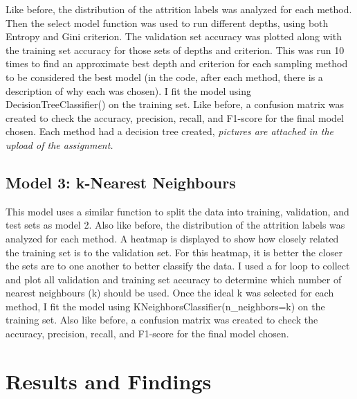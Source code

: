 \documentclass{article}
\begin{document}
Like before, the distribution of the attrition labels was analyzed for each method. Then the select model function was used to run different depths, using both Entropy and Gini criterion. The validation set accuracy was plotted along with the training set accuracy for those sets of depths and criterion. This was run 10 times to find an approximate best depth and criterion for each sampling method to be considered the best model (in the code, after each method, there is a description of why each was chosen). I fit the model using DecisionTreeClassifier() on the training set. Like before, a confusion matrix was created to check the accuracy, precision, recall, and F1-score for the final model chosen. Each method had a decision tree created, \textit{pictures are attached in the upload of the assignment.} 

\subsection{Model 3: k-Nearest Neighbours} 
\vspace{-2mm} 
This model uses a similar function to split the data into training, validation, and test sets as model 2. Also like before, the distribution of the attrition labels was analyzed for each method. A heatmap is displayed to show how closely related the training set is to the validation set. For this heatmap, it is better the closer the sets are to one another to better classify the data. I used a for loop to collect and plot all validation and training set accuracy to determine which number of nearest neighbours (k) should be used. Once the ideal k was selected for each method, I fit the model using KNeighborsClassifier(n\_neighbors=k) on the training set. Also like before, a confusion matrix was created to check the accuracy, precision, recall, and F1-score for the final model chosen. 

\section{Results and Findings}
\vspace{-2mm} 
\end{document}
